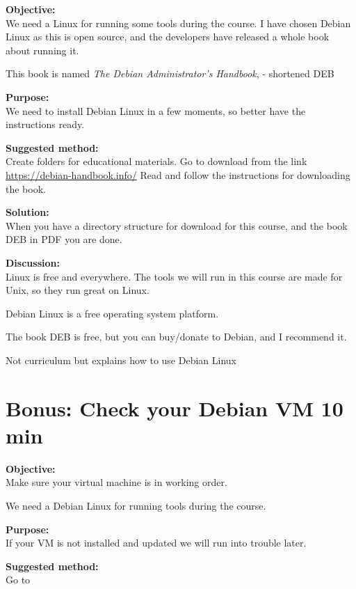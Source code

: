 \documentclass[a4paper,11pt,notitlepage]{report}
\begin{document}


{\bf Objective:}\\
We need a Linux for running some tools during the course. I have chosen Debian Linux as this is open source, and the developers have released a whole book about running it.

This book is named
\emph{The Debian Administrator’s Handbook},  - shortened DEB

{\bf Purpose:}\\
We need to install Debian Linux in a few moments, so better have the instructions ready.

{\bf Suggested method:}\\
Create folders for educational materials. Go to download from the link \url{https://debian-handbook.info/}
Read and follow the instructions for downloading the book.

{\bf Solution:}\\
When you have a directory structure for download for this course, and the book DEB in PDF you are done.

{\bf Discussion:}\\
Linux is free and everywhere. The tools we will run in this course are made for Unix, so they run great on Linux.

Debian Linux is a free operating system platform.

The book DEB is free, but you can buy/donate to Debian, and I recommend it.

Not curriculum but explains how to use Debian Linux


\chapter{Bonus: Check your Debian VM 10 min}
\label{ex:sw-basicDebianVM}


{\bf Objective:}\\
Make sure your virtual machine is in working order.

We need a Debian Linux for running tools during the course.

{\bf Purpose:}\\
If your VM is not installed and updated we will run into trouble later.

{\bf Suggested method:}\\
Go to 
\end{document}
